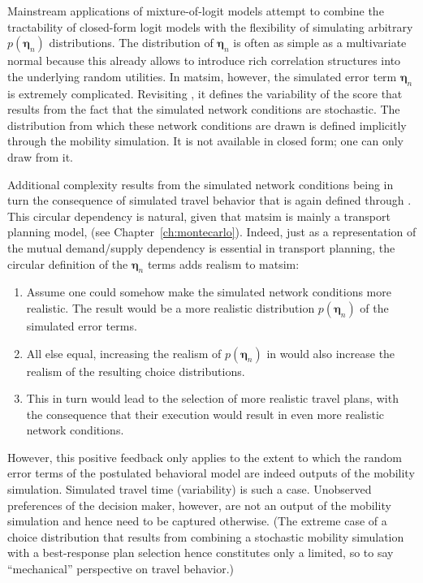 Mainstream applications of mixture-of-logit models attempt to combine
the tractability of closed-form logit models with the flexibility of
simulating arbitrary $p(\boldsymbol{\eta}_n)$ distributions.
The distribution of $\boldsymbol{\eta}_n$ is often as simple as a multivariate normal
because this already allows to introduce rich correlation structures
into the underlying random utilities. In \gls{matsim}, however, the simulated
error term $\boldsymbol{\eta}_n$ is extremely complicated. Revisiting ,
it defines the variability of the score that results from the fact
that the simulated network conditions are stochastic. The distribution
from which these network conditions are drawn is defined implicitly
through the mobility simulation. It is not available in closed form;
one can only draw from it.

Additional complexity results from the simulated network conditions
being in turn the consequence of simulated travel behavior that is
again defined through . This circular
dependency is natural, given that \gls{matsim} is mainly a transport planning
model, (see Chapter~\ref{ch:montecarlo}). Indeed, just as a representation
of the mutual demand/supply dependency is essential in transport planning,
the circular definition of the $\boldsymbol{\eta}_n$ terms adds realism to \gls{matsim}:
\begin{enumerate}
\item Assume one could somehow make the simulated network conditions more
realistic. The result would be a more realistic distribution $p(\boldsymbol{\eta}_n)$
of the simulated error terms.
\item All else equal, increasing the realism of $p(\boldsymbol{\eta}_n)$ in 
would also increase the realism of the resulting choice distributions.
\item This in turn would lead to the selection of more realistic travel
plans, with the consequence that their execution would result in even
more realistic network conditions.
\end{enumerate}
However, this positive feedback only applies to the extent to which
the random error terms of the postulated behavioral model are indeed
outputs of the mobility simulation. Simulated travel time (variability)
is such a case. Unobserved preferences of the decision maker, however,
are not an output of the mobility simulation and hence need to be
captured otherwise. (The extreme case of a choice distribution that
results from combining a stochastic mobility simulation with a best-response
plan selection hence constitutes only a limited, so to say {}``mechanical''
perspective on travel behavior.)

